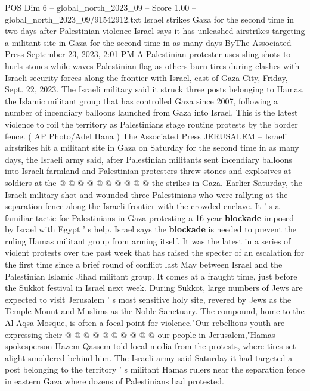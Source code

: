 \begin{textsample}{POS Dim 6 – global\_north\_2023\_09 – Score 1.00 – global\_north\_2023\_09/91542912.txt}  \label{ex:f6_pos_077}
Israel strikes Gaza for the second time in two days after Palestinian violence Israel says it has unleashed airstrikes targeting a militant site in Gaza for the second time in as many days ByThe Associated Press September 23, 2023, 2:01 PM A Palestinian protester uses sling shots to hurls stones while waves Palestinian flag as others burn tires during clashes with Israeli security forces along the frontier with Israel, east of Gaza City, Friday, Sept. 22, 2023.
The Israeli military said it struck three posts belonging to Hamas, the Islamic militant group that has controlled Gaza since 2007, following a number of incendiary balloons launched from Gaza into Israel.
This is the latest violence to roil the territory as Palestinians stage routine protests by the border fence. ( AP Photo/Adel Hana ) The Associated Press JERUSALEM -- Israeli airstrikes hit a militant site in Gaza on Saturday for the second time in as many days, the Israeli army said, after Palestinian militants sent incendiary balloons into Israeli farmland and Palestinian protesters threw stones and explosives at soldiers at the @ @ @ @ @ @ @ @ @ @ the strikes in Gaza.
Earlier Saturday, the Israeli military shot and wounded three Palestinians who were rallying at the separation fence along the Israeli frontier with the crowded enclave.
It ' s a familiar tactic for Palestinians in Gaza protesting a 16-year \textbf{blockade} imposed by Israel with Egypt ' s help.
Israel says the \textbf{blockade} is needed to prevent the ruling Hamas militant group from arming itself.
It was the latest in a series of violent protests over the past week that has raised the specter of an escalation for the first time since a brief round of conflict last May between Israel and the Palestinian Islamic Jihad militant group.
It comes at a fraught time, just before the Sukkot festival in Israel next week.
During Sukkot, large numbers of Jews are expected to visit Jerusalem ' s most sensitive holy site, revered by Jews as the Temple Mount and Muslims as the Noble Sanctuary.
The compound, home to the Al-Aqsa Mosque, is often a focal point for violence."Our rebellious youth are expressing their @ @ @ @ @ @ @ @ @ @ our people in Jerusalem,"Hamas spokesperson Hazem Qassem told local media from the protests, where tires set alight smoldered behind him.
The Israeli army said Saturday it had targeted a post belonging to the territory ' s militant Hamas rulers near the separation fence in eastern Gaza where dozens of Palestinians had protested.

\end{textsample}

